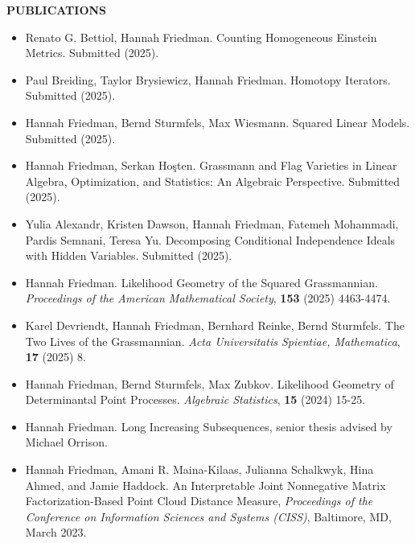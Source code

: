 \documentclass[11pt]{article}
\newcommand{\hdr}[1]{\textcolor{blue(ryb)}{\textbf{#1}}}
\begin{document}
\hdr{PUBLICATIONS}\\
\begin{itemize}
\item Renato G. Bettiol, Hannah Friedman.
  Counting Homogeneous Einstein Metrics.
  Submitted (2025).
\item Paul Breiding, Taylor Brysiewicz, Hannah Friedman.
  Homotopy Iterators.
  Submitted (2025). 
\item Hannah Friedman, Bernd Sturmfels, Max Wiesmann.
  Squared Linear Models.
  Submitted (2025). 
\item Hannah Friedman, Serkan Ho\c{s}ten.
  Grassmann and Flag Varieties in Linear Algebra, Optimization, and Statistics: An Algebraic Perspective.
  Submitted (2025).
\item Yulia Alexandr, Kristen Dawson, Hannah Friedman, Fatemeh Mohammadi, Pardis Semnani, Teresa Yu.
  Decomposing Conditional Independence Ideals with Hidden Variables. Submitted (2025).
\item Hannah Friedman.
  Likelihood Geometry of the Squared Grassmannian. \textit{Proceedings of the American Mathematical Society}, \textbf{153} (2025) 4463-4474.
  \item Karel Devriendt, Hannah Friedman, Bernhard Reinke, Bernd Sturmfels.
    The Two Lives of the Grassmannian.
    \textit{Acta Universitatis Spientiae, Mathematica}, \textbf{17} (2025) 8. 
\item Hannah Friedman, Bernd Sturmfels, Max Zubkov.
  Likelihood Geometry of Determinantal Point Processes.
  \emph{Algebraic Statistics}, \textbf{15} (2024) 15-25.
\item Hannah Friedman. Long Increasing Subsequences, senior thesis advised by Michael Orrison. 
\item Hannah Friedman, Amani R. Maina-Kilaas, Julianna Schalkwyk, Hina Ahmed, and Jamie Haddock. 
  An Interpretable Joint Nonnegative Matrix Factorization-Based Point Cloud Distance Measure, \emph{Proceedings of the Conference on Information Sciences and Systems (CISS)}, Baltimore, MD, March 2023.
\end{itemize}

\bigskip
\end{document}
